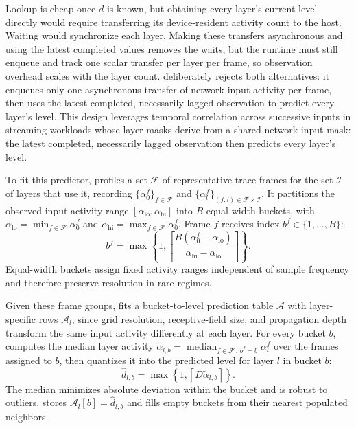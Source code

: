 Lookup is cheap once $d$ is known, but obtaining every layer's current level
directly would require transferring its device-resident activity count to the
host. Waiting would synchronize each layer. Making these transfers asynchronous
and using the latest completed values removes the waits, but the runtime must
still enqueue and track one scalar transfer per layer per frame, so observation
overhead scales with the layer count. \sysname deliberately rejects both
alternatives: it enqueues only one asynchronous transfer of network-input
activity per frame, then uses the latest completed, necessarily lagged
observation to predict every layer's level. This design leverages temporal
correlation across successive inputs in streaming workloads whose layer masks
derive from a shared network-input mask: the latest completed, necessarily
lagged observation then predicts every layer's level.

To fit this predictor, \sysname profiles a set $\mathcal{F}$ of representative
trace frames for the set $\mathcal{I}$ of layers that use it, recording
$\{\alpha_0^f\}_{f\in\mathcal{F}}$ and
$\{\alpha_l^f\}_{(f,l)\in\mathcal{F}\times\mathcal{I}}$. It partitions the
observed input-activity range $[\alpha_{\mathrm{lo}},\alpha_{\mathrm{hi}}]$
into $B$ equal-width buckets, with
$\alpha_{\mathrm{lo}}=\min_{f\in\mathcal{F}}\alpha_0^f$ and
$\alpha_{\mathrm{hi}}=\max_{f\in\mathcal{F}}\alpha_0^f$. Frame $f$ receives
index $b^f\in\{1,\ldots,B\}$:
\begin{equation}
  b^f = \max\left\{1,
    \left\lceil
      \frac{B(\alpha_0^f-\alpha_{\mathrm{lo}})}
           {\alpha_{\mathrm{hi}}-\alpha_{\mathrm{lo}}}
    \right\rceil\right\}.
  \label{eq:input-bucket}
\end{equation}
Equal-width buckets assign fixed activity ranges independent of sample
frequency and therefore preserve resolution in rare regimes.

Given these frame groups, \sysname fits a bucket-to-level prediction table
$\mathcal{A}$ with layer-specific rows $\mathcal{A}_l$, since grid resolution,
receptive-field size, and propagation depth transform the same input activity
differently at each layer. For every bucket $b$, \sysname computes the median
layer activity
$\widetilde{\alpha}_{l,b}=
\operatorname*{median}_{f\in\mathcal{F}\,:\,b^f=b}\alpha_l^f$ over the frames assigned to
$b$, then quantizes it into the predicted level for layer $l$ in bucket $b$:
\begin{equation}
  \hat{d}_{l,b} =
    \max\left\{1,
      \left\lceil D\widetilde{\alpha}_{l,b}\right\rceil\right\}.
  \label{eq:mapfit}
\end{equation}
The median minimizes absolute deviation within the bucket and is robust to
outliers. \sysname stores $\mathcal{A}_l[b]=\hat{d}_{l,b}$ and fills empty
buckets from their nearest populated neighbors.

